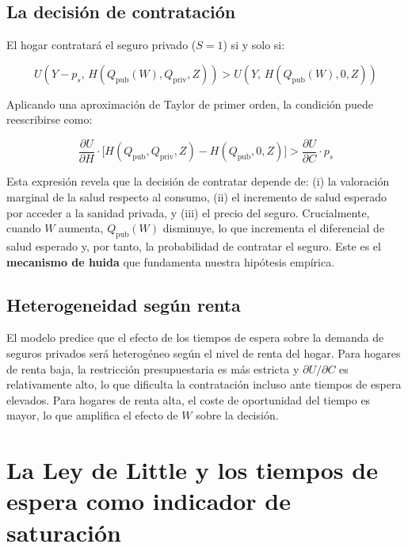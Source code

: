 \subsection{La decisión de contratación}

El hogar contratará el seguro privado ($S=1$) si y solo si:

\begin{equation}
  U\!\left(Y - p_s,\, H(Q_{\text{pub}}(W), Q_{\text{priv}}, Z)\right)
  > U\!\left(Y,\, H(Q_{\text{pub}}(W), 0, Z)\right)
  \label{eq:decision}
\end{equation}

Aplicando una aproximación de Taylor de primer orden, la condición puede
reescribirse como:

\begin{equation}
  \frac{\partial U}{\partial H} \cdot
  \bigl[ H(Q_{\text{pub}}, Q_{\text{priv}}, Z)
       - H(Q_{\text{pub}}, 0, Z) \bigr]
  > \frac{\partial U}{\partial C} \cdot p_s
  \label{eq:condicion_contratacion}
\end{equation}

Esta expresión revela que la decisión de contratar depende de: (i) la valoración
marginal de la salud respecto al consumo, (ii) el incremento de salud esperado por
acceder a la sanidad privada, y (iii) el precio del seguro. Crucialmente, cuando
$W$ aumenta, $Q_{\text{pub}}(W)$ disminuye, lo que incrementa el diferencial de
salud esperado y, por tanto, la probabilidad de contratar el seguro. Este es el
\textbf{mecanismo de huida} que fundamenta nuestra hipótesis empírica.

\subsection{Heterogeneidad según renta}

El modelo predice que el efecto de los tiempos de espera sobre la demanda de
seguros privados será heterogéneo según el nivel de renta del hogar. Para hogares
de renta baja, la restricción presupuestaria es más estricta y
$\partial U / \partial C$ es relativamente alto, lo que dificulta la contratación
incluso ante tiempos de espera elevados. Para hogares de renta alta, el coste de
oportunidad del tiempo es mayor, lo que amplifica el efecto de $W$ sobre la
decisión.

\section{La Ley de Little y los tiempos de espera como indicador de saturación}

